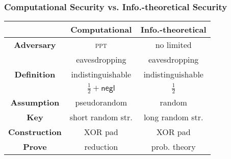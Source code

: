 \begin{frame}\frametitle{Computational Security vs. Info.-theoretical Security}
\begin{center}
\begin{tabular}{|c|c|c|} \hline
                      & \textbf{Computational} & \textbf{Info.-theoretical} \\ \hline
\textbf{Adversary}    & \textsc{ppt} & no limited \\ 
                      & eavesdropping & eavesdropping\\ \hline 
\textbf{Definition}   & indistinguishable & indistinguishable \\ 
                      & $\frac{1}{2} + \mathsf{negl}$ & $\frac{1}{2}$ \\ \hline
\textbf{Assumption}   & pseudorandom & random   \\ \hline
\textbf{Key}	      & short random str. & long random str.\\ \hline
\textbf{Construction} & XOR pad & XOR pad \\ \hline 
\textbf{Prove}        & reduction & prob. theory  \\ \hline
\end{tabular}	
\end{center}
\end{frame}

